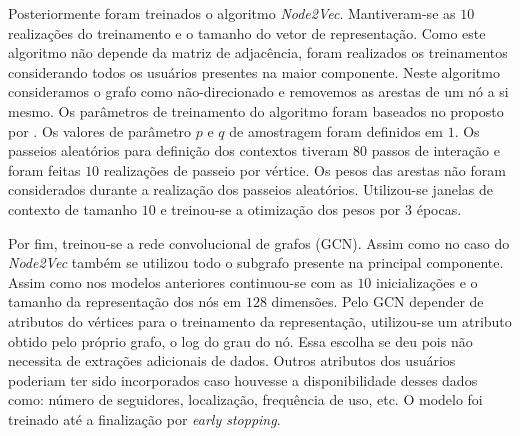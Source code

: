 Posteriormente foram treinados o algoritmo \textit{Node2Vec}.
Mantiveram-se as $10$ realizações do treinamento e o tamanho do vetor de
representação.
Como este algoritmo não depende da matriz de adjacência, foram realizados os
treinamentos considerando todos os usuários presentes na maior componente.
Neste algoritmo consideramos o grafo como não-direcionado e removemos as arestas
de um nó a si mesmo.
Os parâmetros de treinamento do algoritmo foram baseados no proposto por
\citet{grover16}.
Os valores de parâmetro $p$ e $q$ de amostragem foram definidos em $1$.
Os passeios aleatórios para definição dos contextos tiveram $80$ passos
de interação e foram feitas $10$ realizações de passeio por vértice.
Os pesos das arestas não foram considerados durante a realização dos passeios
aleatórios.
Utilizou-se janelas de contexto de tamanho $10$ e treinou-se a otimização dos
pesos por $3$ épocas.

Por fim, treinou-se a rede convolucional de grafos (GCN).
Assim como no caso do \textit{Node2Vec} também se utilizou todo o subgrafo
presente na principal componente.
Assim como nos modelos anteriores continuou-se com as $10$ inicializações e o
tamanho da representação dos nós em $128$ dimensões.
Pelo GCN depender de atributos do vértices para o treinamento da representação,
utilizou-se um atributo obtido pelo próprio grafo, o log do grau do nó.
Essa escolha se deu pois não necessita de extrações adicionais de dados.
Outros atributos dos usuários poderiam ter sido incorporados caso houvesse a
disponibilidade desses dados como: número de seguidores, localização,
frequência de uso, etc.
O modelo foi treinado até a finalização por \textit{early stopping}.


